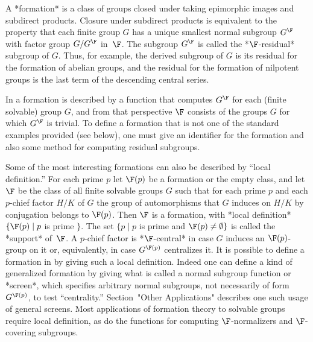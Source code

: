 


A *formation* is a class of groups closed under taking epimorphic
images and subdirect products. Closure under subdirect products is equivalent to the property that each finite group $G$  has a unique 
smallest normal subgroup $G^{\F}$ with factor group $G / G^{\F}$ in~$\F$. 
The subgroup $G^{\F}$ is called the *$\F$-residual* subgroup of $G$. Thus, 
for example, the derived subgroup of $G$ is its residual for the formation 
of abelian groups, and the residual for the formation of nilpotent groups 
is the last term of the descending central series. 

In {\FORMAT} a formation is described by a function that computes $G^\F$ 
for each (finite solvable) group $G$, and from that perspective $\F$ 
consists of the groups $G$ for which $G^\F$ is trivial. To define a 
formation that is not one of the standard examples provided (see below), 
one must give {\GAP} an identifier for the formation and also some method 
for computing residual subgroups. 

Some of the most interesting formations can also be described by 
``local definition.''  For each prime $p$ 
let $\F(p)$ be a formation or the empty class, and let $\F$ be the class 
of all finite solvable groups $G$ such that for each prime $p$ and each $p$-chief factor $H/K$ of $G$ the group of automorphisms that $G$ 
induces on $H/K$ by conjugation belongs to $\F(p)$. Then $\F$ is a 
formation,  with  *local definition* $\{ \F(p) \mid p $ is prime $ \}$. 
The set $\{ p  \mid p$ is prime and $\F(p) \neq \emptyset \}$ is called the 
*support* of~$\F$. A $p$-chief factor is *$\F$-central* in case $G$
induces an $\F(p)$-group on it or, equivalently, in case $G^{\F(p)}$
centralizes it. It is possible to define a formation in {\FORMAT} by
giving such a local definition. Indeed one can define a kind of
generalized formation by giving what is called a normal subgroup function 
or *screen*, which specifies arbitrary normal subgroups, not necessarily 
of form $G^{\F(p)}$, to test ``centrality.'' Section~"Other Applications" describes one such usage of general screens. Most applications of formation 
theory to solvable groups require local definition, as do the {\GAP} 
functions for computing $\F$-normalizers and $\F$-covering subgroups. 

